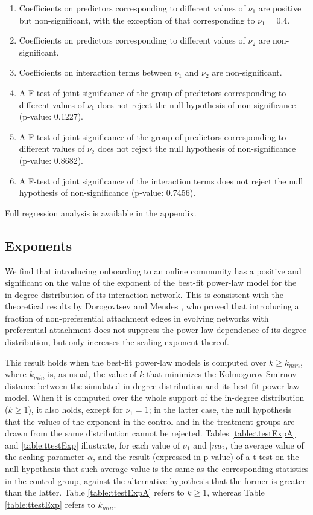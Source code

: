 \documentclass{nws}
\begin{document}
\begin{enumerate}
\item Coefficients on predictors corresponding to different values of $\nu_1$ are positive but non-significant, with the exception of that corresponding to $\nu_1 = 0.4$.
\item Coefficients on predictors corresponding to different values of $\nu_2$ are non-significant.
\item Coefficients on interaction terms between $\nu_1$ and $\nu_2$ are non-significant.
\item A F-test of joint significance of the group of predictors corresponding to different values of $\nu_1$ does not reject the null hypothesis of non-significance (p-value: 0.1227).
\item A F-test of joint significance of the group of predictors corresponding to different values of $\nu_2$ does not reject the null hypothesis of non-significance (p-value: 0.8682).
\item A F-test of joint significance of the interaction terms does not reject the null hypothesis of non-significance (p-value: 0.7456).
\end{enumerate}

Full regression analysis is available in the appendix.


\subsection{Exponents} \label{ssec:exponents}
We find that introducing onboarding to an online community has a positive and significant on the value of the exponent of the best-fit power-law model for the in-degree distribution of its interaction network. This is consistent with the theoretical results by Dorogovtsev and Mendes \cite{dorogovtsev2002evolution}, who proved that introducing a fraction of non-preferential attachment edges in evolving networks with preferential attachment does not suppress the power-law dependence of its degree distribution, but only increases the scaling exponent thereof. 

This result holds when the best-fit power-law models is computed over $k \geq k_{min}$, where $k_{min}$ is, as usual, the value of $k$ that minimizes the Kolmogorov-Smirnov distance between the simulated in-degree distribution and its best-fit power-law model. When it is computed over the whole support of the in-degree distribution ($k \geq  1$), it also holds, except for $\nu_1 = 1$; in the latter case, the null hypothesis that the values of the exponent in the control and in the treatment groups are drawn from the same distribution cannot be rejected. Tables \ref {table:ttestExpA} and \ref {table:ttestExp} illustrate, for each value of  $\nu_1$ and $|nu_2$, the average value of the scaling parameter $\alpha$, and the result (expressed in p-value) of a t-test on the null hypothesis that such average value is the same as the corresponding statistics in the control group, against the alternative hypothesis that the former is greater than the latter. Table \ref{table:ttestExpA} refers to $k \geq  1$, whereas Table \ref{table:ttestExp} refers to $k_{min}$.
\end{document}
